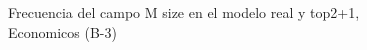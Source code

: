 \begin{figure}[H]
    \centering
    
    \caption{Frecuencia del campo M size en el modelo real y top2+1, Economicos (B-3)}
    \label{frecuency-M Size-top2+1}
\end{figure}